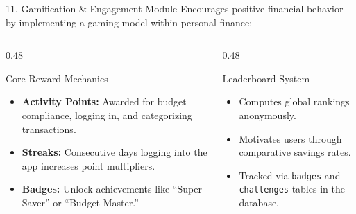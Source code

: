 \documentclass[10pt,aspectratio=169]{beamer}
\begin{document}
\begin{frame}{11. Gamification \& Engagement Module}
    Encourages positive financial behavior by implementing a gaming model within personal finance:
    
    \begin{columns}[T]
        \begin{column}{0.48\textwidth}
            \begin{block}{Core Reward Mechanics}
                \begin{itemize}
                    \item \textbf{Activity Points:} Awarded for budget compliance, logging in, and categorizing transactions.
                    \item \textbf{Streaks:} Consecutive days logging into the app increases point multipliers.
                    \item \textbf{Badges:} Unlock achievements like ``Super Saver'' or ``Budget Master.''
                \end{itemize}
            \end{block}
        \end{column}
        \begin{column}{0.48\textwidth}
            \begin{block}{Leaderboard System}
                \begin{itemize}
                    \item Computes global rankings anonymously.
                    \item Motivates users through comparative savings rates.
                    \item Tracked via \texttt{badges} and \texttt{challenges} tables in the database.
                \end{itemize}
            \end{block}
        \end{column}
    \end{columns}
\end{frame}
\end{document}
